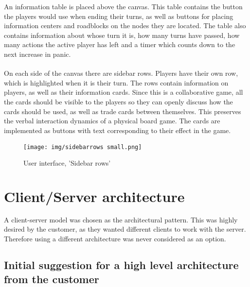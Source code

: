An information table is placed above the canvas. This table contains the button the players would use when ending their turns, as well as buttons for placing information centers and roadblocks on the nodes they are located. The table also contains information about whose turn it is, how many turns have passed, how many actions the active player has left and a timer which counts down to the next increase in panic. \\
\\
On each side of the canvas there are sidebar rows. Players have their own row, which is highlighted when it is their turn. The rows contain information on players, as well as their information cards. Since this is a collaborative game, all the cards should be visible to the players so they can openly discuss how the cards should be used, as well as trade cards between themselves. This preserves the verbal interaction dynamics of a physical board game. The cards are implemented as buttons with text corresponding to their effect in the game. \\

\begin{figure}[H]
  \centering
    \texttt{[image: img/sidebarrows small.png]}
  \caption{User interface, 'Sidebar rows'} 
  \label{fig:sidebar}
\end{figure}




\section{Client/Server architecture}
A client-server model was chosen as the architectural pattern. This was highly desired by the customer, as they wanted different clients
to work with the server. Therefore using a different architecture was never considered as an option.

\subsection{Initial suggestion for a high level architecture from the customer}

